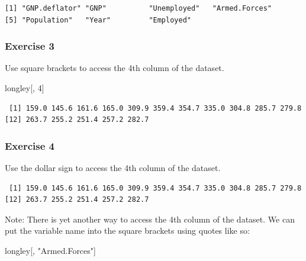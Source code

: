 \documentclass[]{article}
\newenvironment{Shaded}{\begin{snugshade}}{\end{snugshade}}
\newcommand{\DecValTok}[1]{\textcolor[rgb]{0.00,0.00,0.81}{#1}}
\newcommand{\StringTok}[1]{\textcolor[rgb]{0.31,0.60,0.02}{#1}}
\newcommand{\OperatorTok}[1]{\textcolor[rgb]{0.81,0.36,0.00}{\textbf{#1}}}
\newcommand{\NormalTok}[1]{#1}
\theoremstyle{definition}
\theoremstyle{definition}
\theoremstyle{definition}
\theoremstyle{remark}
\begin{document}
\begin{verbatim}
[1] "GNP.deflator" "GNP"          "Unemployed"   "Armed.Forces"
[5] "Population"   "Year"         "Employed"    
\end{verbatim}

\subsubsection{Exercise 3}\label{exercise-3-1}

Use square brackets to access the 4th column of the dataset.

\begin{Shaded}
\begin{Highlighting}[]
\NormalTok{longley[, }\DecValTok{4}\NormalTok{]}
\end{Highlighting}
\end{Shaded}

\begin{verbatim}
 [1] 159.0 145.6 161.6 165.0 309.9 359.4 354.7 335.0 304.8 285.7 279.8
[12] 263.7 255.2 251.4 257.2 282.7
\end{verbatim}

\subsubsection{Exercise 4}\label{exercise-4-1}

Use the dollar sign to access the 4th column of the dataset.

\begin{Shaded}
\end{Shaded}

\begin{verbatim}
 [1] 159.0 145.6 161.6 165.0 309.9 359.4 354.7 335.0 304.8 285.7 279.8
[12] 263.7 255.2 251.4 257.2 282.7
\end{verbatim}

Note: There is yet another way to access the 4th column of the dataset.
We can put the variable name into the square brackets using quotes like
so:

\begin{Shaded}
\begin{Highlighting}[]
\NormalTok{longley[, }\StringTok{"Armed.Forces"}\NormalTok{]}
\end{Highlighting}
\end{Shaded}
\end{document}
